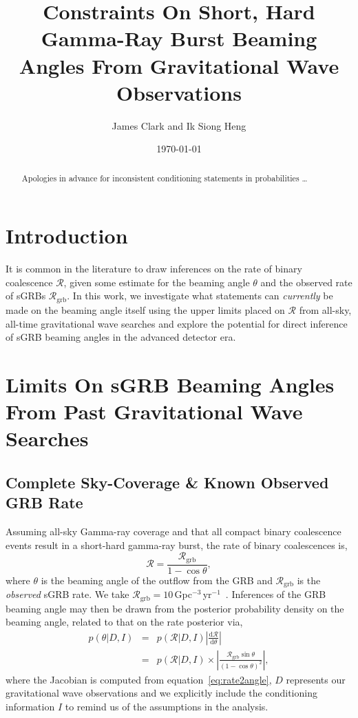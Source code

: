 \documentclass[twocolumn,nofootinbib]{revtex4}
\newcommand{\gw}{gravitational wave }
\newcommand{\grbrate}{{{\mathcal R}_{\mathrm{grb}}}}
\newcommand{\cbcrate}{{{\mathcal R}}}
\newcommand{\diff}{{\mathrm d}}
\begin{document}
\title{Constraints On Short, Hard Gamma-Ray Burst Beaming Angles From
Gravitational Wave Observations}
\author{James Clark and Ik Siong Heng}
\date{\today}

\begin{abstract}
Apologies in advance for inconsistent conditioning statements in probabilities
\dots
\end{abstract}

\maketitle

\section{Introduction}

It is common in the literature to draw inferences on the rate of binary
coalescence $\cbcrate$, given some estimate for the beaming angle $\theta$ and
the observed rate of sGRBs $\grbrate$.  In this work, we investigate what
statements can \emph{currently} be made on the beaming angle itself using the
upper limits placed on $\cbcrate$ from all-sky, all-time \gw searches and
explore the potential for direct inference of sGRB  beaming angles in the
advanced detector era.

\section{Limits On sGRB Beaming Angles From Past Gravitational Wave Searches}

\subsection{Complete Sky-Coverage \& Known Observed GRB Rate}
Assuming all-sky Gamma-ray coverage and that all compact binary coalescence
events result in a short-hard gamma-ray burst, the rate of binary coalescences
is,
%
\begin{equation}\label{eq:rate2angle}
\cbcrate=\frac{\grbrate}{1-\cos \theta},
\end{equation}
where $\theta$ is the beaming angle of the outflow from the GRB and $\grbrate$
is the \emph{observed} sGRB rate.  We take
$\grbrate=10$\,Gpc$^{-3}$\,yr$^{-1}$~\cite{nakar-2007,Dietz11}.
%
Inferences of the GRB beaming angle may then be drawn from the posterior
probability density on the beaming angle, related to that on the rate posterior
via,
%
\begin{eqnarray}
p(\theta|D,I) & = & p(\cbcrate|D,I) \left|\frac{\diff \cbcrate}{\diff
\theta}\right| \\
\label{eq:rate2angleProb}
& = & p(\cbcrate|D,I) \times \left| \frac{\grbrate\sin\theta}{(1-\cos \theta)^2} \right|,
\end{eqnarray}
%
where the Jacobian is computed from equation~\ref{eq:rate2angle}, $D$ represents
our \gw observations and we explicitly include the conditioning information $I$
to remind us of the assumptions in the analysis.
\end{document}

